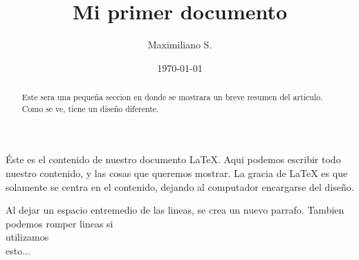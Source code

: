\documentclass[12pt ,letterpaper]{article}
\title{Mi primer documento}
\author{Maximiliano S.}
\date{\today}
\begin{document}
    \begin{titlepage}
        \maketitle
    \end{titlepage}

    \begin{abstract}
        Este sera una pequeña seccion en donde se mostrara un breve resumen del
        articulo. Como se ve, tiene un diseño diferente.
    \end{abstract}

    Éste es el contenido de nuestro documento \LaTeX. Aqui podemos escribir
    todo nuestro contenido, y las cosas que queremos mostrar. La gracia de \LaTeX
    es que solamente se centra en el contenido, dejando al computador encargarse
    del diseño.

    Al dejar un espacio entremedio de las lineas, se crea un nuevo parrafo.
    Tambien podemos romper lineas si \\ utilizamos \\ esto...
\end{document}
